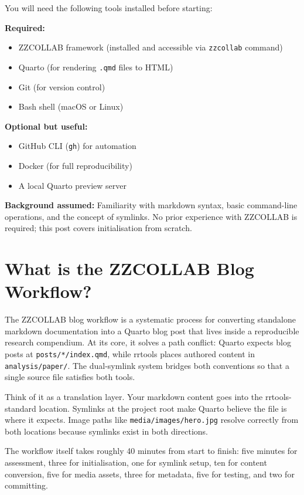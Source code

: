 \documentclass[
  letterpaper,
  DIV=11,
  numbers=noendperiod]{scrartcl}
\providecommand{\tightlist}{%
  \setlength{\itemsep}{0pt}\setlength{\parskip}{0pt}}
\begin{document}
You will need the following tools installed before starting:

\textbf{Required:}

\begin{itemize}
\tightlist
\item
  ZZCOLLAB framework (installed and accessible via \texttt{zzcollab}
  command)
\item
  Quarto (for rendering \texttt{.qmd} files to HTML)
\item
  Git (for version control)
\item
  Bash shell (macOS or Linux)
\end{itemize}

\textbf{Optional but useful:}

\begin{itemize}
\tightlist
\item
  GitHub CLI (\texttt{gh}) for automation
\item
  Docker (for full reproducibility)
\item
  A local Quarto preview server
\end{itemize}

\textbf{Background assumed:} Familiarity with markdown syntax, basic
command-line operations, and the concept of symlinks. No prior
experience with ZZCOLLAB is required; this post covers initialisation
from scratch.

\section{What is the ZZCOLLAB Blog
Workflow?}\label{what-is-the-zzcollab-blog-workflow}

The ZZCOLLAB blog workflow is a systematic process for converting
standalone markdown documentation into a Quarto blog post that lives
inside a reproducible research compendium. At its core, it solves a path
conflict: Quarto expects blog posts at \texttt{posts/*/index.qmd}, while
rrtools places authored content in \texttt{analysis/paper/}. The
dual-symlink system bridges both conventions so that a single source
file satisfies both tools.

Think of it as a translation layer. Your markdown content goes into the
rrtools-standard location. Symlinks at the project root make Quarto
believe the file is where it expects. Image paths like
\texttt{media/images/hero.jpg} resolve correctly from both locations
because symlinks exist in both directions.

The workflow itself takes roughly 40 minutes from start to finish: five
minutes for assessment, three for initialisation, one for symlink setup,
ten for content conversion, five for media assets, three for metadata,
five for testing, and two for committing.
\end{document}
